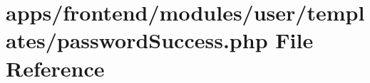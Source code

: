\hypertarget{frontend_2modules_2user_2templates_2password_success_8php}{\section{apps/frontend/modules/user/templates/password\-Success.php File Reference}
\label{frontend_2modules_2user_2templates_2password_success_8php}
}
